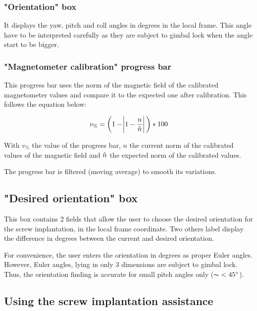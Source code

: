 \documentclass{article}
\begin{document}
\subsubsection{"Orientation" box}

It displays the yaw, pitch and roll angles in degrees in the local frame. This angle have to be interpreted carefully as they are subject to gimbal lock when the angle start to be bigger.

\subsubsection{"Magnetometer calibration" progress bar}

This progress bar uses the norm of the magnetic field of the calibrated magnetometer values and compare it to the expected one after calibration. This follows the equation below:

$$v_{\%} = \bigg(1 - \abs{1 - \frac{n}{\Hat{n}}}\bigg) * 100 $$

With $ v_{\%} $ the value of the progress bar, $ n $ the current norm of the calibrated values of the magnetic field and $ \Hat{n} $ the expected norm of the calibrated values.

\vspace{\baselineskip}

The progress bar is filtered (moving average) to smooth its variations.

\subsection{"Desired orientation" box}

This box contains 2 fields that allow the user to choose the desired orientation for the screw implantation, in the local frame coordinate. Two others label display the difference in degrees between the current and desired orientation.

\vspace{\baselineskip}

For convenience, the user enters the orientation in degrees as proper Euler angles. However, Euler angles, lying in only 3 dimensions are subject to gimbal lock. Thus, the orientation finding is accurate for small pitch angles only ($\thicksim \ < 45^{\circ}$).  


\subsection{Using the screw implantation assistance}
\end{document}
